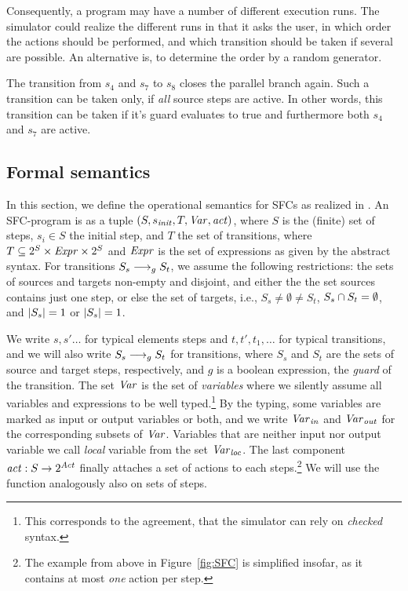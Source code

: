 Consequently, a program may have a number of different execution runs.  The
simulator could realize the different runs in that it asks the user, in which
order the actions should be performed, and which transition should be taken if
several are possible.  An alternative is, to determine the order by a random
generator.

The transition from $s_4$ and $s_7$ to $s_8$ closes the parallel branch again.
Such a transition can be taken only, if \emph{all} source steps are active. In
other words, this transition can be taken if it's guard evaluates to true and
furthermore both $s_4$ and $s_7$ are active.



\ifweb\else
\subsection{Formal semantics}
\label{sec:semantics.formal}

In this section, we define the operational semantics for SFCs as realized
in \Slime. An SFC-program is as a tuple $(S,s_{\mathit{init}},T,\mathit{Var},\mathit{act})$, where
$S$ is the (finite) set of steps, $s_i \in S$ the initial step, and $T$ the
set of transitions, where $T \subseteq 2^S \times \mathit{Expr} \times 2^S$ and
$\mathit{Expr}$ is the set of expressions as given by the abstract syntax. For
transitions $S_s \longrightarrow_{g} S_t$, we assume the following restrictions: the
sets of sources and targets non-empty and disjoint, and either the the set
sources contains just one step, or else the set of targets, i.e., $S_s
\not= \emptyset \not= S_t$, $S_s \cap S_t = \emptyset$, and
${\mid}{S_s}{\mid} = 1$ or ${\mid}{S_s}{\mid} = 1$.

We write $s, s' \ldots$ for typical elements steps and $t,t', t_1, \ldots$
for typical transitions, and we will also write $S_s \longrightarrow_{g} S_t$ for
transitions, where $S_s$ and $S_t$ are the sets of source and target steps,
respectively, and $g$ is a boolean expression, the \emph{guard} of the
transition. The set $\mathit{Var}$ is the set of \emph{variables} where we silently
assume all variables and expressions to be well typed.\footnote{This
  corresponds to the agreement, that the simulator can rely on
  \emph{checked} syntax.}  By the typing, some variables are marked as
input or output variables or both, and we write $\mathit{Var}_{\mathit{in}}$ and $\mathit{Var}_{\mathit{out}}$ for
the corresponding subsets of $\mathit{Var}$.  Variables that are neither input nor
output variable we call \emph{local} variable from the set $\mathit{Var}_{\mathit{loc}}$.  The
last component $\mathit{act} \mathrel{:} S \to 2^{\mathit{Act}}$ finally attaches a set of actions to
each steps.\footnote{The example from above in Figure~\ref{fig:SFC} is
  simplified insofar, as it contains at most \emph{one} action per step.}
We will use the function analogously also on sets of steps.


